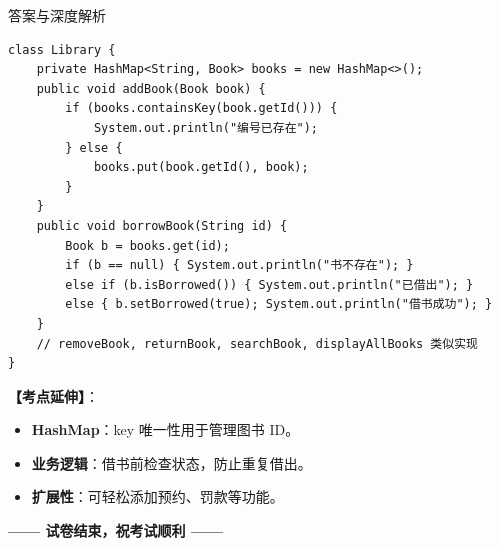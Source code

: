 \documentclass[12pt, a4paper]{ctexart}
\begin{document}
\begin{enumerate}[label=\arabic*.]
\begin{bluebox}{答案与深度解析}
\begin{lstlisting}
class Library {
    private HashMap<String, Book> books = new HashMap<>();
    public void addBook(Book book) {
        if (books.containsKey(book.getId())) {
            System.out.println("编号已存在");
        } else {
            books.put(book.getId(), book);
        }
    }
    public void borrowBook(String id) {
        Book b = books.get(id);
        if (b == null) { System.out.println("书不存在"); }
        else if (b.isBorrowed()) { System.out.println("已借出"); }
        else { b.setBorrowed(true); System.out.println("借书成功"); }
    }
    // removeBook, returnBook, searchBook, displayAllBooks 类似实现
}
\end{lstlisting}
		      \textbf{【考点延伸】}：
		      \begin{itemize}[leftmargin=*, nosep]
			      \item \textbf{HashMap}：key 唯一性用于管理图书 ID。
			      \item \textbf{业务逻辑}：借书前检查状态，防止重复借出。
			      \item \textbf{扩展性}：可轻松添加预约、罚款等功能。
		      \end{itemize}
	      \end{bluebox}
\end{enumerate}

\begin{center}
	{\large\bfseries\color{myblue} —— 试卷结束，祝考试顺利 ——}
\end{center}
\end{document}
